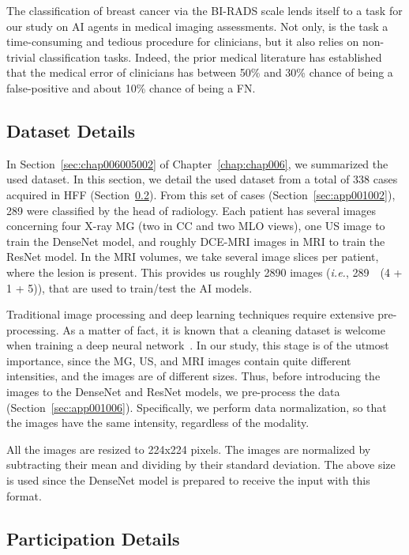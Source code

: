The classification of breast cancer via the \ac{BI-RADS} scale lends itself to a task for our study on AI agents in medical imaging assessments.
Not only, is the task a time-consuming and tedious procedure for clinicians, but it also relies on non-trivial classification tasks.
Indeed, the prior medical literature has established that the medical error of clinicians has between 50\% and 30\% chance of being a false-positive and about 10\% chance of being a \ac{FN}.

\subsection{Dataset Details}
\label{sec:app005006002}

In Section~\ref{sec:chap006005002} of Chapter~\ref{chap:chap006}, we summarized the used dataset.
In this section, we detail the used dataset from a total of 338 cases acquired in \acl{HFF} (Section~\ref{sec:app005006003}).
From this set of cases (Section~\ref{sec:app001002}), 289 were classified by the head of radiology.
Each patient has several images concerning four X-ray \ac{MG} (two in \ac{CC} and two \ac{MLO} views), one \ac{US} image to train the DenseNet model, and roughly \acs{DCE-MRI} images in \ac{MRI} to train the ResNet model.
In the \ac{MRI} volumes, we take several image slices per patient, where the lesion is present.
This provides us roughly 2890 images ({\it i.e.}, 289~\texttimes~(4 + 1 + 5)), that are used to train/test the \ac{AI} models.

Traditional image processing and deep learning techniques require extensive pre-processing.
As a matter of fact, it is known that a cleaning dataset is welcome when training a deep neural network~\cite{RIASATIAN2021102032}.
In our study, this stage is of the utmost importance, since the \ac{MG}, \ac{US}, and \ac{MRI} images contain quite different intensities, and the images are of different sizes.
Thus, before introducing the images to the DenseNet and ResNet models, we pre-process the data (Section~\ref{sec:app001006}).
Specifically, we perform data normalization, so that the images have the same intensity, regardless of the modality.

All the images are resized to 224x224 pixels.
The images are normalized by subtracting their mean and dividing by their standard deviation.
The above size is used since the DenseNet model is prepared to receive the input with this format.

\subsection{Participation Details}
\label{sec:app005006003}


